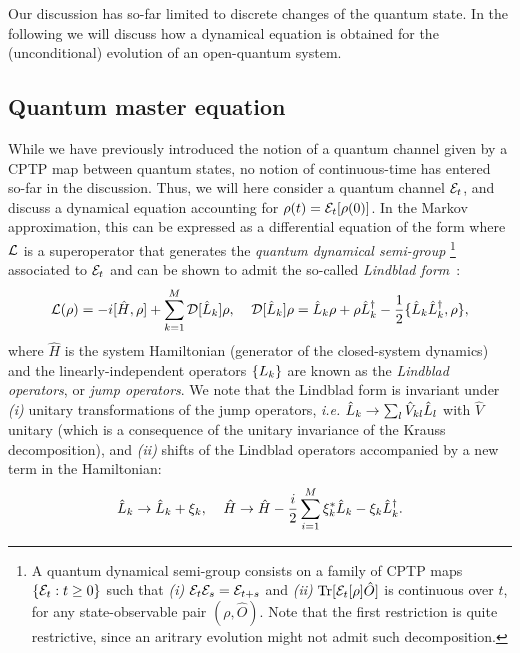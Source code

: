 Our discussion has so-far limited to discrete changes of the quantum state. In the following we will discuss how a dynamical equation is obtained for the (unconditional) evolution of an open-quantum system.
\subsection{Quantum master equation}\label{ssec:1_intro_open}

While we have previously introduced the notion of a quantum channel given by a CPTP map between quantum states, no notion of continuous-time has entered so-far in the discussion. Thus, we will here consider a quantum channel $\mathcal{E} _t$, and discuss a dynamical equation accounting for $\rho(t)  = \mathcal{E} _t[\rho(0)]$. In the Markov approximation, this can be expressed as a differential equation of the form
where $\mathcal{L}$ is a superoperator that generates the \textit{quantum dynamical semi-group}
\footnote{A quantum dynamical semi-group consists on a family of CPTP maps $\lbrace {\mathcal{E}}_t:t\geq0\rbrace$ such that \textit{(i)} $\mathcal{E} _t \mathcal{E} _s=\mathcal{E} _{t+s}$ and \textit{(ii)} $\text{Tr}[\mathcal{E} _t [\rho] \hat{O}]$ is continuous over $t$, for any state-observable pair $(\rho, \hat{O})$. Note that the first restriction is quite restrictive, since an aritrary evolution might not admit such decomposition.}
associated to $\mathcal{E} _t$ and can be shown to admit the so-called \textit{Lindblad form}~\cite{libland1976, wisemanbook, manzano2019}:
\begin{equation}\label{eq:libland}
\mathcal{L}(\rho)= -i[\hat{H},\rho] +  \sum_{k=1}^{M} \mathcal{D}[\hat{L}_k]\rho, \;\;\;\; \mathcal{D}[\hat{L}_k]\rho = \hat{L}_k \rho + \rho \hat{L}_k^\dagger - \frac{1}{2}\lbrace \hat{L}_k \hat{L}_k^\dagger, \rho\rbrace,
\end{equation}
where $\hat{H}$ is the system Hamiltonian (generator of the closed-system dynamics) and the linearly-independent operators $\lbrace L_k\rbrace$ are known as the \textit{Lindblad operators}, or \textit{jump operators}. We note that the Lindblad form is invariant under \textit{(i)} unitary transformations of the jump operators, \textit{i.e.} $\hat{L}_k \rightarrow \sum_l \hat{V}_{kl}\hat{L}_l$ with $\hat{V}$ unitary (which is a consequence of the unitary invariance of the Krauss decomposition), and
\textit{(ii)} shifts of the Lindblad operators accompanied by a new term in the Hamiltonian:
\begin{equation}\label{eq:invalibland}
\hat{L}_k \rightarrow \hat{L}_k + \xi_k, \;\;\;\; \hat{H} \rightarrow \hat{H} - \frac{i}{2}\sum_{i=1}^M \xi_k^* \hat{L}_k - \xi_k {{\hat{L}}^\dagger}_k.
\end{equation}
